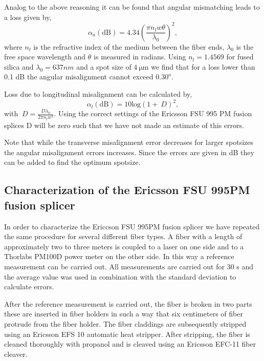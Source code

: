 Analog to the above reasoning it can be found that angular mismatching leads to a loss given by, 
\begin{equation}
\alpha_a(\mathrm{dB}) = 4.34 \left( \frac{\pi n_l w \theta}{\lambda_0}\right)^2, 
\end{equation}
where $n_l$ is the refractive index of the medium between the fiber ends, $\lambda_0$ is the free space wavelength and $\theta$ is measured in radians. Using $n_l = 1.4569$ for fused silica and $\lambda_0 = 637 nm$ and a spot size of $4 \: \mathrm{\mu m}$ we find that for a loss lower than 0.1 dB the angular misalignment cannot exceed $0.30 ^o$. 

Loss due to longitudinal misalignment can be calculated by, 
\begin{equation}
\alpha_l(\mathrm{dB}) = \mathrm{10log}\left( 1 + ~D \right)^2,
\end{equation}
with $~D = \frac{D \lambda_0}{2 \pi n_l w^2}$. Using the correct settings of the Ericsson FSU 995 PM fusion splices D will be zero such that we have not made an estimate of this errors. 

Note that while the transverse misalignment error decreases for larger spotsizes the angular misalignment errors increases. Since the errors are given in dB they can be added to find the optimum spotsize. 

\color{tudelft-cyan}
\subsection{Characterization of the Ericsson FSU 995PM fusion splicer}
\color{black}
In order to characterize the Ericcson FSU 995PM fusion splicer we have repeated the same procedure for several different fiber types. A fiber with a length of approximately two to three meters is coupled to a laser on one side and to a Thorlabs PM100D power meter on the other side. In this way a reference measurement can be carried out. All measurements are carried out for 30 s and the average value was used in combination with the standard deviation to calculate errors.

After the reference measurement is carried out, the fiber is broken in two parts these are inserted in fiber holders in such a way that six centimeters of fiber protrude from the fiber holder. The fiber claddings are subsequently stripped using an Ericsson EFS 10 automatic heat stripper. After stripping, the fiber is cleaned thoroughly with propanol and is cleaved using an Ericsson EFC-11 fiber cleaver. 

